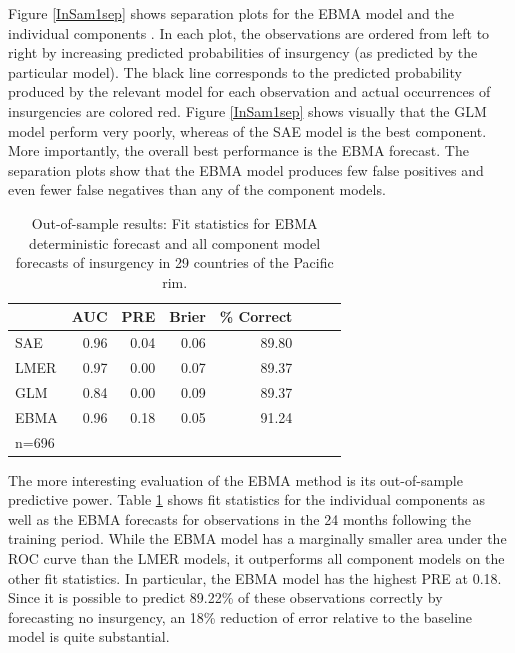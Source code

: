 \documentclass[pdftex,12pt,fullpage,oneside]{amsart}
\begin{document}
Figure \ref{InSam1sep} shows separation plots for the EBMA model and
the individual components \citep{Greenhill:Forthcoming}. In each plot,
the observations are ordered from left to right by increasing
predicted probabilities of insurgency (as predicted by the particular
model). The black line corresponds to the predicted probability
produced by the relevant model for each observation and actual
occurrences of insurgencies are colored red.  Figure \ref{InSam1sep}
shows visually that the GLM model perform very poorly, whereas of the
SAE model is the best component.  More importantly, the overall best
performance is the EBMA forecast. The separation plots show that the
EBMA model produces few false positives and even fewer false negatives
than any of the component models.




\begin{table}
\small
\begin{center}
\caption{\footnotesize Out-of-sample results: Fit statistics for EBMA
    deterministic forecast and all component model forecasts of
    insurgency in 29 countries of the Pacific rim.}\label{OutSam1}
\begin{tabular}{l rrrrrrr}
  \toprule
 & AUC & PRE & Brier & \% Correct \\ 
  \midrule
  SAE &  0.96 & 0.04 & 0.06 & 89.80 \\ 
  LMER & 0.97 & 0.00 & 0.07 & 89.37\\ 
  GLM & 0.84 & 0.00 & 0.09 & 89.37\\ 
  EBMA & 0.96 & 0.18 & 0.05 & 91.24 \\ 
   \bottomrule
n=696 \\
\end{tabular}
\end{center}
\end{table}



The more interesting evaluation of the EBMA method is its
out-of-sample predictive power. Table \ref{OutSam1} shows fit
statistics for the individual components as well as the EBMA forecasts
for observations in the 24 months following the training period.
While the EBMA model has a marginally smaller area under the ROC curve
than the LMER models, it outperforms all component models on the other
fit statistics. In particular, the EBMA model has the highest PRE at
0.18.  Since it is possible to predict 89.22\% of these observations
correctly by forecasting no insurgency, an 18\% reduction of error
relative to the baseline model is quite substantial.
\end{document}

